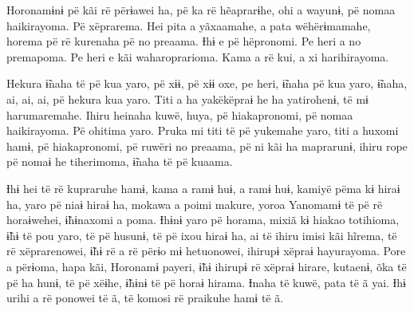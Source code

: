 Horonamɨnɨ pë kãi rë përɨawei ha, pë ka rë hẽaprarɨhe, ohi a wayunɨ, pë
nomaa haikirayoma. Pë xëprarema. Hei pita a yãxaamahe, a pata
wëhërɨmamahe, horema pë rë kurenaha pë no preaama. Ɨhɨ e pë hëpronomi.
Pe heri a no premapoma. Pe heri e kãi waharoprarioma. Kama a rë kui, a
xi harihirayoma. 

Hekura ɨ̃naha të pë kua yaro, pë xɨɨ, pë xɨɨ oxe, pe heri, ɨ̃naha pë kua
yaro, ɨ̃naha, ai, ai, ai, pë hekura kua yaro. Titi a ha yakëkëpraɨ he ha
yatirohenɨ, të mɨ harumaremahe. Ihiru heinaha kuwë, huya, pë
hiakapronomi, pë nomaa haikirayoma. Pë ohitima yaro. Pruka mi titi të pë
yukemahe yaro, titi a huxomi hamɨ, pë hiakapronomi, pë ruwëri no
preaama, pë ni kãi ha maprarunɨ, ihiru rope pë nomaɨ he tiherimoma,
ɨ̃naha të pë kuaama. 

Ɨhɨ hei të rë kupraruhe hamɨ, kama a ramɨ huɨ, a ramɨ huɨ, kamiyë pëma
kɨ hiraɨ ha, yaro pë niaɨ hiraɨ ha, mokawa a poimi makure, yoroa
Yanomamɨ të pë rë horaɨwehei, ɨ̃hɨnaxomi a poma. Ɨhɨnɨ yaro pë horama,
mixiã kɨ hiakao totihioma, ɨ̃hɨ të pou yaro, të pë husunɨ, të pë ixou
hiraɨ ha, ai të ihiru imisi kãi hĩrema, të rë xëprarenowei, ɨ̃hɨ rë a rë
përɨo mɨ hetuonowei, ihirupɨ xëpraɨ hayurayoma. Pore a përɨoma, hapa
kãi, Horonamɨ payeri, ɨ̃hɨ ihirupɨ rë xëpraɨ hirare, kutaenɨ, õka të pë
ha hunɨ, të pë xëɨhe, ɨ̃hɨnɨ të pë horaɨ hirama. Ɨnaha të kuwë, pata të ã
yai. Ɨhɨ urihi a rë ponowei të ã, të komosi rë praikuhe hamɨ të ã.

 

